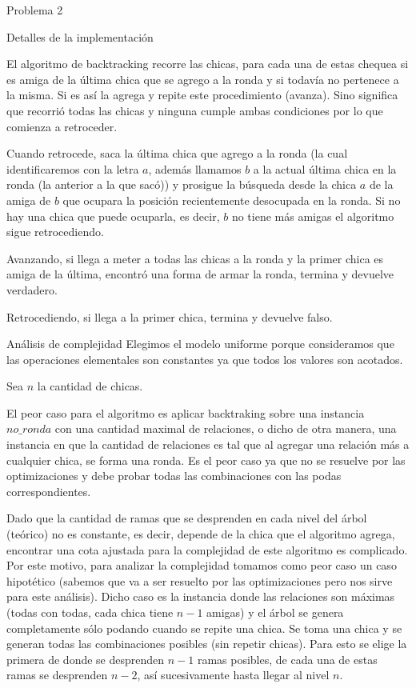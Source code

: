 \begin{section}{Problema 2}
\begin{subsection}{Detalles de la implementación}
\begin{itemize}
		\end{itemize}

		El algoritmo de backtracking recorre las chicas, para cada una de estas chequea si es amiga de la última chica que se agrego a la ronda y si todavía no pertenece a la misma. Si es así la agrega y repite este procedimiento (avanza). Sino significa que recorrió todas las chicas y ninguna cumple ambas condiciones por lo que comienza a retroceder.

		Cuando retrocede, saca la última chica que agrego a la ronda (la cual identificaremos con la letra $a$, además llamamos $b$ a la actual última chica en la ronda (la anterior a la que sacó)) y prosigue la búsqueda desde la chica $a$ de la amiga de $b$ que ocupara la posición recientemente desocupada en la ronda. Si no hay una chica que puede ocuparla, es decir, $b$ no tiene más amigas el algoritmo sigue retrocediendo.

		Avanzando, si llega a meter a todas las chicas a la ronda y la primer chica es amiga de la última, encontró una forma de armar la ronda, termina y devuelve verdadero.

		Retrocediendo, si llega a la primer chica, termina y devuelve falso.
	\end{subsection}
			
	\begin{subsection}{Análisis de complejidad}
			Elegimos el modelo uniforme porque consideramos que las operaciones elementales son constantes ya que todos los valores son acotados.\Pa
		
			Sea $n$ la cantidad de chicas.	
		
			El peor caso para el algoritmo es aplicar backtraking sobre una instancia $no\_ronda$ con una cantidad maximal de relaciones,
o dicho de otra manera, una instancia en que la cantidad de relaciones es tal que al agregar una relación más a cualquier chica, se forma una ronda. Es el peor caso ya que no se resuelve por las optimizaciones y debe probar todas las combinaciones con las podas correspondientes.
			
			Dado que la cantidad de ramas que se desprenden en cada nivel del árbol (teórico) no es constante, es decir, depende de la chica que el algoritmo agrega, encontrar una cota ajustada para la complejidad de este algoritmo es complicado. Por este motivo, para analizar la complejidad tomamos como peor caso un caso hipotético (sabemos que va a ser resuelto por las optimizaciones pero nos sirve para este análisis). Dicho caso es la instancia donde las relaciones son máximas (todas con todas, cada chica tiene $n-1$ amigas) y el árbol se genera completamente sólo podando cuando se repite una chica. Se toma una chica y se generan todas las combinaciones posibles (sin repetir chicas). Para esto se elige la primera de donde se desprenden $n-1$ ramas posibles, de cada una de estas ramas se desprenden $n-2$, así sucesivamente hasta llegar al nivel $n$.


\end{subsection}
\end{section}
